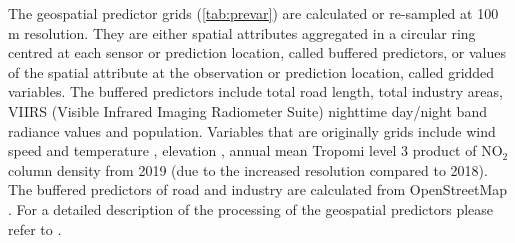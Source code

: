 \documentclass{article}
\begin{document}
The geospatial predictor grids (\cref{tab:prevar}) are calculated or re-sampled at 100 m resolution. They are either spatial attributes aggregated in a circular ring centred at each sensor or prediction location, called buffered predictors, or values of the spatial attribute at the observation or prediction location, called gridded variables. The buffered predictors include total road length, total industry areas, VIIRS (Visible Infrared Imaging Radiometer Suite) nighttime day/night band radiance values \citep[nightlight,][]{nightlight} and population. Variables that are originally grids include wind speed and temperature \citep{dee2011era}, elevation \citep{elevation}, annual mean Tropomi level 3 product of NO$_2$ column density  \citep{TROPOMIgee} from 2019 (due to the increased resolution compared to 2018). The buffered predictors of road and industry are calculated from OpenStreetMap  \citep{openstreetmap}. For a detailed description of the processing of the geospatial predictors please refer to \cite{luglobal}.   
\end{document}
